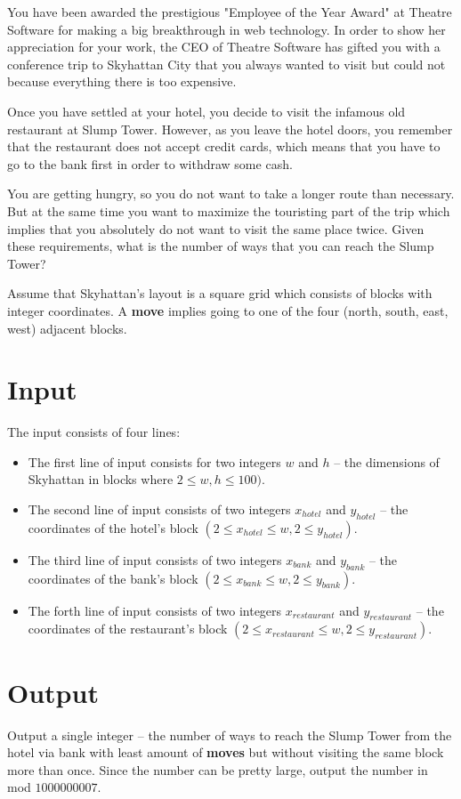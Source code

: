 
You have been awarded the prestigious "Employee of the Year Award" at Theatre Software for making a big breakthrough in web technology. In order to show her appreciation for your work, the CEO of Theatre Software has gifted you with a conference trip to Skyhattan City that you always wanted to visit but could not because everything there is too expensive.

Once you have settled at your hotel, you decide to visit the infamous old restaurant at Slump Tower. However, as you leave the hotel doors, you remember that the restaurant does not accept credit cards, which means that you have to go to the bank first in order to withdraw some cash.

You are getting hungry, so you do not want to take a longer route than necessary. But at the same time you want to maximize the touristing part of the trip which implies that you absolutely do not want to visit the same place twice. Given these requirements, what is the number of ways that you can reach the Slump Tower?

Assume that Skyhattan's layout is a square grid which consists of blocks with integer coordinates. A \textbf{move} implies going to one of the four (north, south, east, west) adjacent blocks.

\section*{Input}

The input consists of four lines:
\begin{itemize}

\item The first line of input consists for two integers $w$ and $h$ -- the dimensions of Skyhattan in blocks where $2 \leq w, h  \leq 100)$.

\item The second line of input consists of two integers $x_{hotel}$ and $y_{hotel}$ -- the coordinates of the hotel's block $(2 \leq x_{hotel} \leq w, 2 \leq y_{hotel})$.

\item The third line of input consists of two integers $x_{bank}$ and $y_{bank}$ -- the coordinates of the bank's block $(2 \leq x_{bank} \leq w, 2 \leq y_{bank})$.

\item The forth line of input consists of two integers $x_{restaurant}$ and $y_{restaurant}$ -- the coordinates of the restaurant's block $(2 \leq x_{restaurant} \leq w, 2 \leq y_{restaurant})$.

\end{itemize}

\section*{Output}

Output a single integer -- the number of ways to reach the Slump Tower from the hotel via bank with least amount of \textbf{moves} but without visiting the same block more than once. Since the number can be pretty large, output the number in mod $1000000007$.
